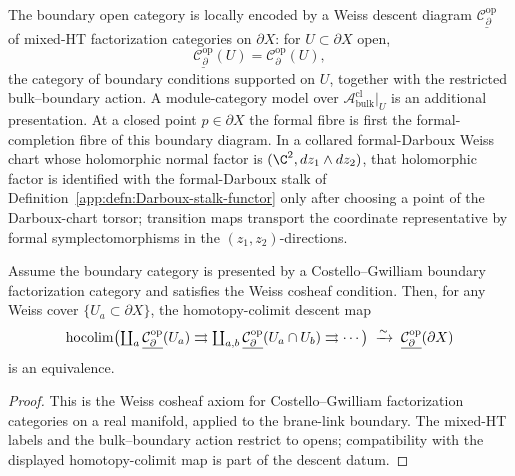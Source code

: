 \begin{defn}\label{app:defn:sheaf-fact-cat-CG}
The boundary open category is locally encoded by a Weiss descent diagram
$\underline{\mathcal{C}^{\mathrm{op}}_\partial}$ of mixed-HT
factorization categories on $\partial X$: for
$U\subset\partial X$ open,
\[
  \underline{\mathcal{C}^{\mathrm{op}}_\partial}(U)
   =\mathcal C^{\mathrm{op}}_\partial(U),
\]
the category of boundary conditions supported on \(U\), together with
the restricted bulk--boundary action.  A module-category model over
\(\mathcal A^{\mathrm{cl}}_{\mathrm{bulk}}|_U\) is an additional
presentation.  At a closed point \(p\in\partial X\) the formal fibre is
first the formal-completion fibre of this boundary diagram.  In a
collared formal-Darboux Weiss chart whose holomorphic normal factor is
\((\C^2,dz_1\wedge dz_2)\), that holomorphic factor is identified with
the formal-Darboux stalk of
Definition~\ref{app:defn:Darboux-stalk-functor} only after choosing a
point of the Darboux-chart torsor; transition maps transport the
coordinate representative by formal symplectomorphisms in the
\((z_1,z_2)\)-directions.
\end{defn}

\begin{thm}\label{app:thm:cg-etale-descent}
Assume the boundary category is presented by a Costello--Gwilliam
boundary factorization category and satisfies the Weiss cosheaf
condition.  Then, for any Weiss cover
\(\{U_a\subset\partial X\}\), the homotopy-colimit descent map
\[
   \operatornamewithlimits{hocolim}\bigl(\textstyle\coprod_a
    \underline{\mathcal{C}^{\mathrm{op}}_\partial}(U_a)
    \rightrightarrows
    \coprod_{a,b}\underline{\mathcal{C}^{\mathrm{op}}_\partial}(U_a\cap U_b)
    \rightrightarrows\cdots\bigr)
  \;\xrightarrow{\sim}\;
  \underline{\mathcal{C}^{\mathrm{op}}_\partial}(\partial X)
\]
is an equivalence.
\end{thm}

\begin{proof}
This is the Weiss cosheaf axiom for Costello--Gwilliam
factorization categories on a real manifold, applied to the
brane-link boundary.  The mixed-HT labels and the bulk--boundary
action restrict to opens; compatibility with the displayed
homotopy-colimit map is part of the descent datum.
\end{proof}

